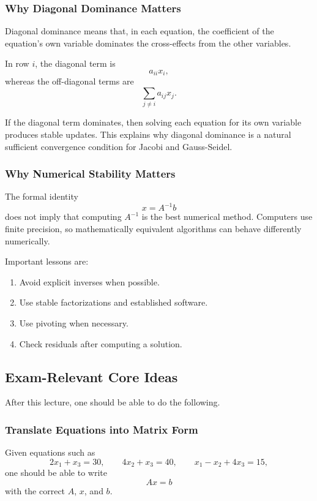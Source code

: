 \documentclass[10pt, letterpaper]{article}
\begin{document}
\subsubsection{Why Diagonal Dominance Matters}

Diagonal dominance means that, in each equation, the coefficient of the equation's own variable dominates the cross-effects from the other variables.

In row \(i\), the diagonal term is
\[
a_{ii}x_i,
\]
whereas the off-diagonal terms are
\[
\sum_{j\neq i}a_{ij}x_j.
\]

If the diagonal term dominates, then solving each equation for its own variable produces stable updates. This explains why diagonal dominance is a natural sufficient convergence condition for Jacobi and Gauss-Seidel.

\subsubsection{Why Numerical Stability Matters}

The formal identity
\[
x=A^{-1}b
\]
does not imply that computing \(A^{-1}\) is the best numerical method. Computers use finite precision, so mathematically equivalent algorithms can behave differently numerically.

Important lessons are:
\begin{enumerate}
    \item Avoid explicit inverses when possible.
    \item Use stable factorizations and established software.
    \item Use pivoting when necessary.
    \item Check residuals after computing a solution.
\end{enumerate}

\subsection{Exam-Relevant Core Ideas}

After this lecture, one should be able to do the following.

\subsubsection{Translate Equations into Matrix Form}

Given equations such as
\[
2x_1+x_3=30,
\qquad
4x_2+x_3=40,
\qquad
x_1-x_2+4x_3=15,
\]
one should be able to write
\[
Ax=b
\]
with the correct \(A\), \(x\), and \(b\).
\end{document}
